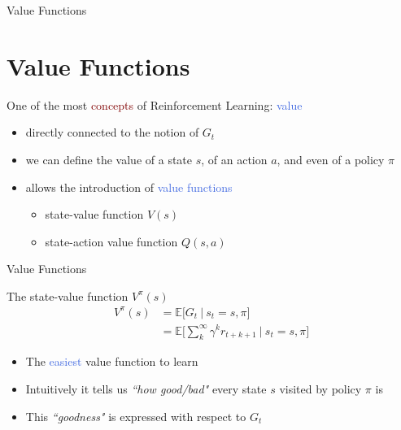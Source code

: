\documentclass{beamer}
\begin{document}
\begin{frame}{Value Functions}
	\section{Value Functions}

	One of the most \textcolor{Maroon}{concepts} of Reinforcement Learning: \textcolor{RoyalBlue}{value}
	\begin{itemize}
		\item directly connected to the notion of $G_t$
		\item we can define the value of a state $s$, of an action $a$, and even of a policy $\pi$
		\item allows the introduction of \textcolor{RoyalBlue}{value functions}
			\begin{itemize}
				\item state-value function $V(s)$
				\item state-action value function $Q(s,a)$
			\end{itemize}
	\end{itemize}
\end{frame}

\begin{frame}{Value Functions}
	\begin{block}{The state-value function $V^{\pi}(s)$}
		\begin{align*}
			V^{\pi}(s) & = \mathds{E} \bigg[G_t \: \big| \: s_t=s,\pi \bigg] \\ 
				& = \mathds{E} \bigg[\sum_{k}^{\infty}\gamma^{k} r_{t+k+1} \: \bigg| \: s_t=s,\pi \bigg]
		\end{align*}
	\end{block}

	\begin{itemize}
		\item The \textcolor{RoyalBlue}{easiest} value function to learn
		\item Intuitively it tells us \textit{``how good/bad"} every state $s$ visited by policy $\pi$ is
		\item This \textit{``goodness"} is expressed with respect to $G_t$
	\end{itemize}

\end{frame}
\end{document}

